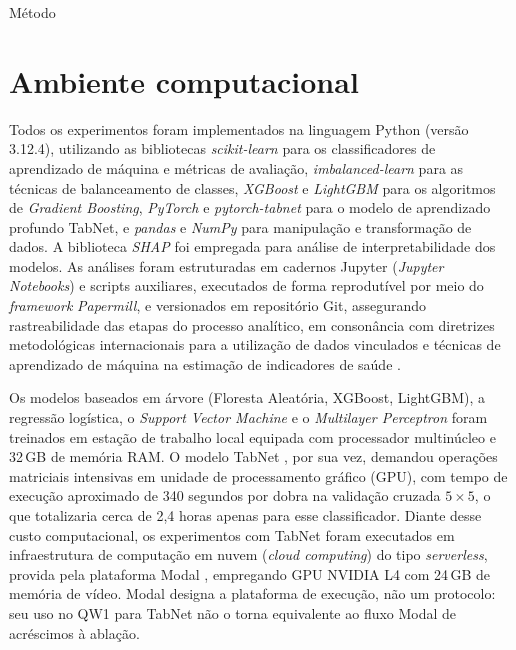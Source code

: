 \begin{chapter}{Método}
\section{Ambiente computacional}\label{sec:ambiente-computacional}

Todos os experimentos foram implementados na linguagem Python (versão 3.12.4), utilizando as bibliotecas \textit{scikit-learn} para os classificadores de aprendizado de máquina e métricas de avaliação, \textit{imbalanced-learn} para as técnicas de balanceamento de classes, \textit{XGBoost} e \textit{LightGBM} para os algoritmos de \textit{Gradient Boosting}, \textit{PyTorch} e \textit{pytorch-tabnet} para o modelo de aprendizado profundo TabNet, e \textit{pandas} e \textit{NumPy} para manipulação e transformação de dados. A biblioteca \textit{SHAP} \cite{Lundberg2017shap} foi empregada para análise de interpretabilidade dos modelos. As análises foram estruturadas em cadernos Jupyter (\textit{Jupyter Notebooks}) e scripts auxiliares, executados de forma reprodutível por meio do \textit{framework} \textit{Papermill}, e versionados em repositório Git, assegurando rastreabilidade das etapas do processo analítico, em consonância com diretrizes metodológicas internacionais para a utilização de dados vinculados e técnicas de aprendizado de máquina na estimação de indicadores de saúde \cite{Haneef2022guidelines}.

Os modelos baseados em árvore (Floresta Aleatória, XGBoost, LightGBM), a regressão logística, o \textit{Support Vector Machine} e o \textit{Multilayer Perceptron} foram treinados em estação de trabalho local equipada com processador multinúcleo e 32\,GB de memória RAM. O modelo TabNet \cite{Arik2021tabnet}, por sua vez, demandou operações matriciais intensivas em unidade de processamento gráfico (GPU), com tempo de execução aproximado de 340 segundos por dobra na validação cruzada $5 \times 5$, o que totalizaria cerca de 2,4 horas apenas para esse classificador. Diante desse custo computacional, os experimentos com TabNet foram executados em infraestrutura de computação em nuvem (\textit{cloud computing}) do tipo \textit{serverless}, provida pela plataforma Modal \cite{Modal2025}, empregando GPU NVIDIA L4 com 24\,GB de memória de vídeo. Modal designa a plataforma de execução, não um protocolo: seu uso no QW1 para TabNet não o torna equivalente ao fluxo Modal de acréscimos à ablação.


\end{chapter}
